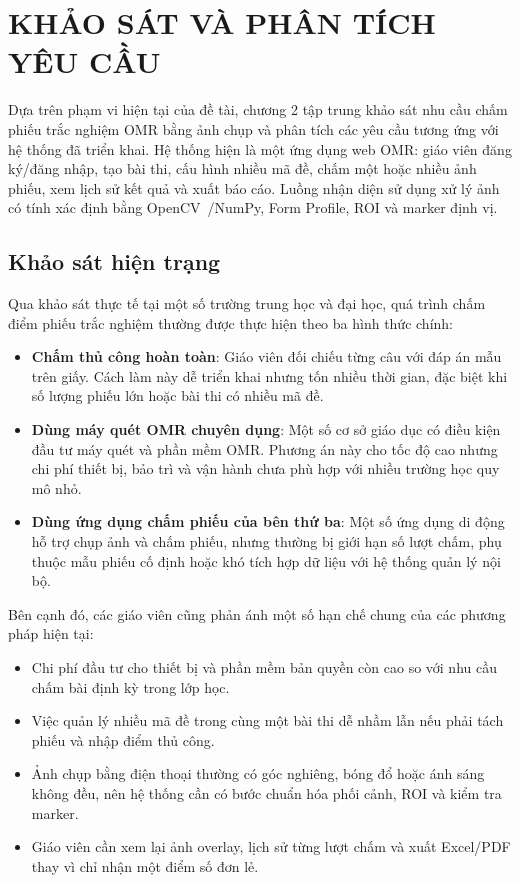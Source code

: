 \chapter{KHẢO SÁT VÀ PHÂN TÍCH YÊU CẦU}
Dựa trên phạm vi hiện tại của đề tài, chương 2 tập trung khảo sát nhu cầu chấm phiếu trắc nghiệm OMR bằng ảnh chụp và phân tích các yêu cầu tương ứng với hệ thống đã triển khai. Hệ thống hiện là một ứng dụng web OMR: giáo viên đăng ký/đăng nhập, tạo bài thi, cấu hình nhiều mã đề, chấm một hoặc nhiều ảnh phiếu, xem lịch sử kết quả và xuất báo cáo. Luồng nhận diện sử dụng xử lý ảnh có tính xác định bằng OpenCV~\cite{opencv}/NumPy, Form Profile, ROI và marker định vị.

\section{Khảo sát hiện trạng}
Qua khảo sát thực tế tại một số trường trung học và đại học, quá trình chấm điểm phiếu trắc nghiệm thường được thực hiện theo ba hình thức chính:

\begin{itemize}
    \item \textbf{Chấm thủ công hoàn toàn}: Giáo viên đối chiếu từng câu với đáp án mẫu trên giấy. Cách làm này dễ triển khai nhưng tốn nhiều thời gian, đặc biệt khi số lượng phiếu lớn hoặc bài thi có nhiều mã đề.
    \item \textbf{Dùng máy quét OMR chuyên dụng}: Một số cơ sở giáo dục có điều kiện đầu tư máy quét và phần mềm OMR. Phương án này cho tốc độ cao nhưng chi phí thiết bị, bảo trì và vận hành chưa phù hợp với nhiều trường học quy mô nhỏ.
    \item \textbf{Dùng ứng dụng chấm phiếu của bên thứ ba}: Một số ứng dụng di động hỗ trợ chụp ảnh và chấm phiếu, nhưng thường bị giới hạn số lượt chấm, phụ thuộc mẫu phiếu cố định hoặc khó tích hợp dữ liệu với hệ thống quản lý nội bộ.
\end{itemize}

Bên cạnh đó, các giáo viên cũng phản ánh một số hạn chế chung của các phương pháp hiện tại:

\begin{itemize}
    \item Chi phí đầu tư cho thiết bị và phần mềm bản quyền còn cao so với nhu cầu chấm bài định kỳ trong lớp học.
    \item Việc quản lý nhiều mã đề trong cùng một bài thi dễ nhầm lẫn nếu phải tách phiếu và nhập điểm thủ công.
    \item Ảnh chụp bằng điện thoại thường có góc nghiêng, bóng đổ hoặc ánh sáng không đều, nên hệ thống cần có bước chuẩn hóa phối cảnh, ROI và kiểm tra marker.
    \item Giáo viên cần xem lại ảnh overlay, lịch sử từng lượt chấm và xuất Excel/PDF thay vì chỉ nhận một điểm số đơn lẻ.
\end{itemize}

